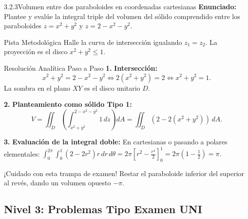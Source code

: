 \documentclass[11pt,a4paper]{article}
\begin{document}
\begin{nivelbox}{3.2.3}{Volumen entre dos paraboloides en coordenadas cartesianas}
\textbf{Enunciado:}\\
Plantee y evalúe la integral triple del volumen del sólido comprendido entre los paraboloides $z = x^2 + y^2$ y $z = 2 - x^2 - y^2$.

\begin{observacionbox}{Pista Metodológica}
Halle la curva de intersección igualando $z_1 = z_2$. La proyección es el disco $x^2 + y^2 \le 1$.
\end{observacionbox}

\begin{ejerciciobox}{Resolución Analítica Paso a Paso}
\smallskip\noindent\textbf{1.} \textbf{Intersección:}
\[x^2 + y^2 = 2 - x^2 - y^2 \iff 2(x^2 + y^2) = 2 \iff x^2 + y^2 = 1.\]
La sombra en el plano $XY$ es el disco unitario $D$.

\smallskip\noindent\textbf{2.} \textbf{Planteamiento como sólido Tipo 1:}
\[V = \iint_D \left( \int_{x^2+y^2}^{2-x^2-y^2} 1 \, dz \right) dA = \iint_D (2 - 2(x^2 + y^2)) \, dA.\]

\smallskip\noindent\textbf{3.} \textbf{Evaluación de la integral doble:}
En cartesianas o pasando a polares elementales: $\int_0^{2\pi} \int_0^1 (2 - 2r^2) r \, dr \, d\theta = 2\pi \left[ r^2 - \frac{r^4}{2} \right]_0^1 = 2\pi \left( 1 - \frac{1}{2} \right) = \pi.$
\end{ejerciciobox}

\begin{errorbox}{¡Cuidado con esta trampa de examen!}
Restar el paraboloide inferior del superior al revés, dando un volumen opuesto $-\pi$.
\end{errorbox}
\end{nivelbox}
\bigskip

\subsection{Nivel 3: Problemas Tipo Examen UNI}
\end{document}
